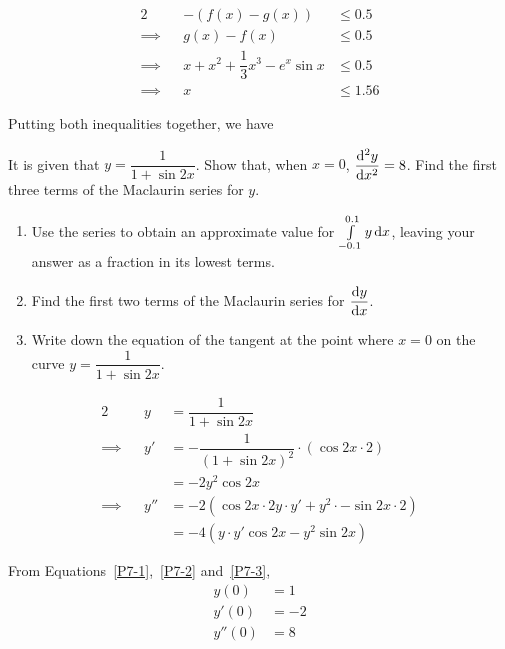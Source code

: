 \documentclass{echw}
\begin{document}
            \begin{alignat*}{2}
                &&-\left(f(x) - g(x)\right) &\leq 0.5\\
                \implies&&g(x) - f(x) &\leq 0.5\\
                \implies&&x + x^2 + \dfrac13 x^3 - e^x \sin x &\leq 0.5\\
                \implies&&x &\leq 1.56
            \end{alignat*}

            Putting both inequalities together, we have


    \problem{}
        It is given that $y = \dfrac1{1 + \sin 2x}$. Show that, when $x = 0$, $\dfrac{\mathrm{d}^{2} y}{\mathrm{d} {x}^{2}} = 8$. Find the first three terms of the Maclaurin series for $y$.

        \begin{enumerate}
            \item Use the series to obtain an approximate value for $\int\limits_{-0.1}^{0.1} y \mathop{\mathrm{d}x}$, leaving your answer as a fraction in its lowest terms.
            \item Find the first two terms of the Maclaurin series for $\dfrac{\mathrm{d} y}{\mathrm{d} x}$.
            \item Write down the equation of the tangent at the point where $x = 0$ on the curve $y = \dfrac1{1 + \sin 2x}$.
        \end{enumerate}

    \solution
        \begin{alignat}{2}
            && y &= \dfrac1{1 + \sin 2x} \label{P7-1} \\
            \implies&&y' &= -\dfrac1{(1+\sin 2x)^2} \cdot (\cos 2x \cdot 2)\nonumber\\
            && &= -2 y^2\cos 2x \label{P7-2}\\
            \implies&&y'' &= -2 \left(\cos 2x \cdot 2y\cdot y' + y^2 \cdot -\sin 2x \cdot 2\right)\nonumber\\
            && &= -4\left(y\cdot y' \cos 2x - y^2\sin 2x  \right)\label{P7-3}
        \end{alignat}
        
        From Equations~\ref{P7-1},~\ref{P7-2} and~\ref{P7-3},
        \begin{align*}
            y(0) &= 1\\
            y'(0) &= -2\\
            y''(0) &= 8
        \end{align*}
\end{document}
